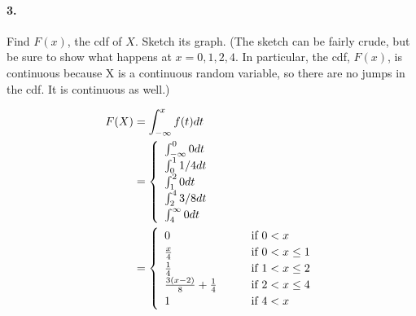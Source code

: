     \paragraph*{3.}
    Find $F(x)$, the cdf of $X$. Sketch its graph. (The sketch can be fairly crude, but be sure to show what happens at $x = 0, 1, 2, 4$. In particular, the cdf, $F(x)$, is continuous because X is a continuous random variable, so there are no jumps in the cdf. It is continuous as well.)
    \\
    \begin{mdframed}
        \begin{align*}
            F(X)    & = \int_{-\infty}^{x} f(t)dt   \\
                    & = \left\{
                        {\def\arraystretch{1.2}
                        \begin{array}{l}
                            \int_{-\infty}^{0}0dt    \\
                            \int_{0}^{1} 1/4dt      \\
                            \int_{1}^{2}0dt         \\
                            \int_{2}^{4}3/8dt       \\
                            \int_{4}^{\infty}0dt
                        \end{array}}
                    \right.                         \\
                    & = \left\{
                        {\def\arraystretch{1.2}
                        \begin{array}{lll}
                            0           & \quad & \text{if } 0 < x          \\
                            \frac{x}{4} & \quad & \text{if } 0 < x \leq 1   \\
                            \frac{1}{4} & \quad & \text{if } 1 < x \leq 2   \\
                            \frac{3(x-2)}{8} + \frac{1}{4} & \quad & \text{if } 2 < x \leq 4\\
                            1           & \quad & \text{if } 4 < x
                        \end{array}}
                    \right.
        \end{align*}

        \centering
    \end{mdframed}

